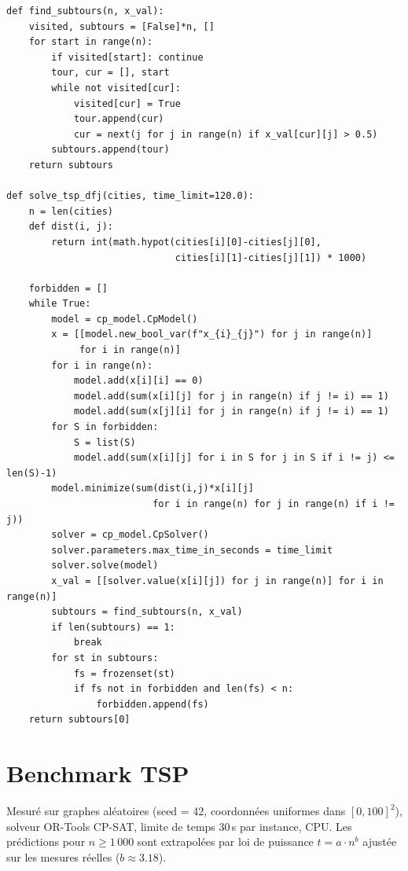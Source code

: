 \documentclass[12pt, a4paper]{article}
\begin{document}
\begin{lstlisting}[caption={ILP DFJ lazy --- CP-SAT iteratif}]
def find_subtours(n, x_val):
    visited, subtours = [False]*n, []
    for start in range(n):
        if visited[start]: continue
        tour, cur = [], start
        while not visited[cur]:
            visited[cur] = True
            tour.append(cur)
            cur = next(j for j in range(n) if x_val[cur][j] > 0.5)
        subtours.append(tour)
    return subtours

def solve_tsp_dfj(cities, time_limit=120.0):
    n = len(cities)
    def dist(i, j):
        return int(math.hypot(cities[i][0]-cities[j][0],
                              cities[i][1]-cities[j][1]) * 1000)

    forbidden = []
    while True:
        model = cp_model.CpModel()
        x = [[model.new_bool_var(f"x_{i}_{j}") for j in range(n)]
             for i in range(n)]
        for i in range(n):
            model.add(x[i][i] == 0)
            model.add(sum(x[i][j] for j in range(n) if j != i) == 1)
            model.add(sum(x[j][i] for j in range(n) if j != i) == 1)
        for S in forbidden:
            S = list(S)
            model.add(sum(x[i][j] for i in S for j in S if i != j) <= len(S)-1)
        model.minimize(sum(dist(i,j)*x[i][j]
                          for i in range(n) for j in range(n) if i != j))
        solver = cp_model.CpSolver()
        solver.parameters.max_time_in_seconds = time_limit
        solver.solve(model)
        x_val = [[solver.value(x[i][j]) for j in range(n)] for i in range(n)]
        subtours = find_subtours(n, x_val)
        if len(subtours) == 1:
            break
        for st in subtours:
            fs = frozenset(st)
            if fs not in forbidden and len(fs) < n:
                forbidden.append(fs)
    return subtours[0]
\end{lstlisting}

\section{Benchmark TSP}

Mesuré sur graphes aléatoires (seed = 42, coordonnées uniformes dans $[0,100]^2$),
solveur OR-Tools CP-SAT, limite de temps 30\,s par instance, CPU.
Les prédictions pour $n \geq 1\,000$ sont extrapolées par loi de puissance
$t = a \cdot n^b$ ajustée sur les mesures réelles ($b \approx 3.18$).
\end{document}
